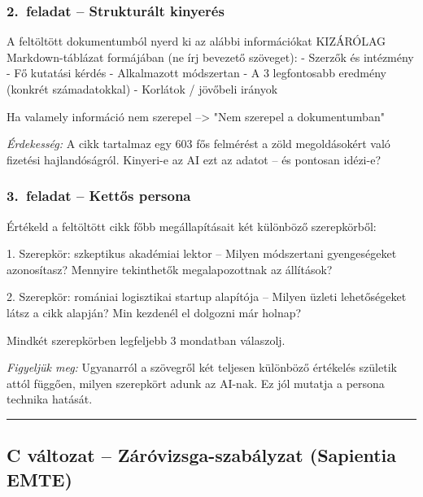 \documentclass[11pt,a4paper]{article}
\begin{document}
\bigskip

\subsubsection*{2.\ feladat -- Strukturált kinyerés}

\begin{prompt}
A feltöltött dokumentumból nyerd ki az alábbi információkat
KIZÁRÓLAG Markdown-táblázat formájában (ne írj bevezető szöveget):
- Szerzők és intézmény
- Fő kutatási kérdés
- Alkalmazott módszertan
- A 3 legfontosabb eredmény (konkrét számadatokkal)
- Korlátok / jövőbeli irányok

Ha valamely információ nem szerepel --> "Nem szerepel a dokumentumban"
\end{prompt}

\noindent\textit{Érdekesség:} A cikk tartalmaz egy 603 fős felmérést
a zöld megoldásokért való fizetési hajlandóságról.
Kinyeri-e az AI ezt az adatot -- és pontosan idézi-e?

\bigskip

\subsubsection*{3.\ feladat -- Kettős persona}

\begin{prompt}
Értékeld a feltöltött cikk főbb megállapításait két különböző szerepkörből:

1. Szerepkör: szkeptikus akadémiai lektor
   -- Milyen módszertani gyengeségeket azonosítasz?
      Mennyire tekinthetők megalapozottnak az állítások?

2. Szerepkör: romániai logisztikai startup alapítója
   -- Milyen üzleti lehetőségeket látsz a cikk alapján?
      Min kezdenél el dolgozni már holnap?

Mindkét szerepkörben legfeljebb 3 mondatban válaszolj.
\end{prompt}

\noindent\textit{Figyeljük meg:} Ugyanarról a szövegről két teljesen
különböző értékelés születik attól függően, milyen szerepkört adunk
az AI-nak. Ez jól mutatja a persona technika hatását.

\bigskip\noindent\rule{\linewidth}{0.4pt}\bigskip

\subsection{C változat -- Záróvizsga-szabályzat (Sapientia EMTE)}
\end{document}
